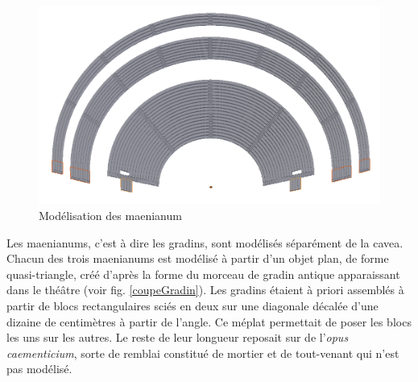 \begin{figure}[!h]
	\includegraphics[width=\linewidth]{images/modMaenianum}
	\caption{Modélisation des \gls{maenianum}} 
	\label{modMaenianum} 
\end{figure} 

Les \glspl{maenianum}, c'est à dire les gradins, sont modélisés séparément de la \gls{cavea}. Chacun des trois \glspl{maenianum} est modélisé à partir d'un objet plan, de forme quasi-triangle, créé d'après la forme du morceau de gradin antique apparaissant dans le théâtre (voir fig. \ref{coupeGradin}). Les gradins étaient à priori assemblés à partir de blocs rectangulaires sciés en deux sur une diagonale décalée d'une dizaine de centimètres à partir de l'angle. Ce méplat permettait de poser les blocs les uns sur les autres. Le reste de leur longueur reposait sur de l'\textit{opus caementicium}, sorte de remblai constitué de mortier et de tout-venant qui n'est pas modélisé. 

